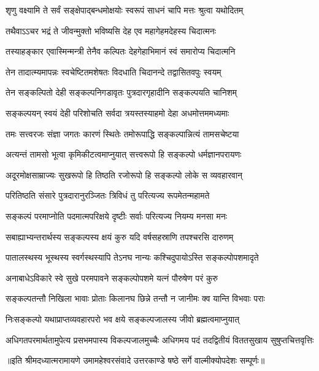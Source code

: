 

\addtocounter{shlokacount}{39}

\twolineshloka
{शृणु वक्ष्यामि ते सर्वं सङ्क्षेपाद्बन्धमोक्षयोः}
{स्वरूपं साधनं चापि मत्तः श्रुत्वा यथोदितम्} %

\twolineshloka
{तथैवाऽऽचर भद्रं ते जीवन्मुक्तो भविष्यसि}
{देह एव महागेहमदेहस्य चिदात्मनः} %

\twolineshloka
{तस्याहङ्कार एवास्मिन्मन्त्री तेनैव कल्पितः}
{देहगेहाभिमानं स्वं समारोप्य चिदात्मनि} %

\twolineshloka
{तेन तादात्म्यमापन्नः स्वचेष्टितमशेषतः}
{विदधाति चिदानन्दे तद्वासितवपुः स्वयम्} %

\twolineshloka
{तेन सङ्कल्पितो देही सङ्कल्पनिगडावृतः}
{पुत्रदारगृहादीनि सङ्कल्पयति चानिशम्} %

\twolineshloka
{सङ्कल्पयन् स्वयं देही परिशोचति सर्वदा}
{त्रयस्तस्याहमो देहा अधमोत्तममध्यमाः} %

\twolineshloka
{तमः सत्त्वरजः संज्ञा जगतः कारणं स्थितेः}
{तमोरूपाद्धि सङ्कल्पान्नित्यं तामसचेष्टया} %

\twolineshloka
{अत्यन्तं तामसो भूत्वा कृमिकीटत्वमाप्नुयात्}
{सत्त्वरूपो हि सङ्कल्पो धर्मज्ञानपरायणः} %

\twolineshloka
{अदूरमोक्षसाम्राज्यः सुखरूपो हि तिष्ठति}
{रजोरूपो हि सङ्कल्पो लोके स व्यवहारवान्} %

\twolineshloka
{परितिष्ठति संसारे पुत्रदारानुरञ्जितः}
{त्रिविधं तु परित्यज्य रूपमेतन्महामते} %

\twolineshloka
{सङ्कल्पं परमाप्नोति पदमात्मपरिक्षये}
{दृष्टीः सर्वाः परित्यज्य नियम्य मनसा मनः} %

\twolineshloka
{सबाह्याभ्यन्तरार्थस्य सङ्कल्पस्य क्षयं कुरु}
{यदि वर्षसहस्राणि तपश्चरसि दारुणम्} %

\twolineshloka
{पातालस्थस्य भूस्थस्य स्वर्गस्थस्यापि तेऽनघ}
{नान्यः कश्चिदुपायोऽस्ति सङ्कल्पोपशमादृते} %

\twolineshloka
{अनाबाधेऽविकारे स्वे सुखे परमपावने}
{सङ्कल्पोपशमे यत्नं पौरुषेण परं कुरु} %

\twolineshloka
{सङ्कल्पतन्तौ निखिला भावाः प्रोताः किलानघ}
{छिन्ने तन्तौ न जानीमः क्व यान्ति विभवाः पराः} %

\twolineshloka
{निःसङ्कल्पो यथाप्राप्तव्यवहारपरो भव}
{क्षये सङ्कल्पजालस्य जीवो ब्रह्मत्वमाप्नुयात्} %

\twolineshloka
{अधिगतपरमार्थतामुपेत्य प्रसभमपास्य विकल्पजालमुच्चैः}
{अधिगमय पदं तदद्वितीयं विततसुखाय सुषुप्तचित्तवृत्तिः} %

{॥इति श्रीमदध्यात्मरामायणे उमामहेश्वरसंवादे उत्तरकाण्डे षष्ठे
सर्गे वाल्मीक्योपदेशः  सम्पूर्णः॥}
